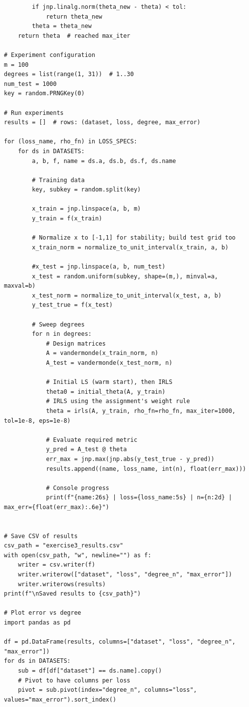 \documentclass[a4paper,12pt]{article}
\begin{document}
\begin{lstlisting}
        if jnp.linalg.norm(theta_new - theta) < tol:
            return theta_new
        theta = theta_new
    return theta  # reached max_iter

# Experiment configuration
m = 100
degrees = list(range(1, 31))  # 1..30
num_test = 1000
key = random.PRNGKey(0)

# Run experiments
results = []  # rows: (dataset, loss, degree, max_error)

for (loss_name, rho_fn) in LOSS_SPECS:
    for ds in DATASETS:
        a, b, f, name = ds.a, ds.b, ds.f, ds.name

        # Training data
        key, subkey = random.split(key)
        
        x_train = jnp.linspace(a, b, m)
        y_train = f(x_train)

        # Normalize x to [-1,1] for stability; build test grid too
        x_train_norm = normalize_to_unit_interval(x_train, a, b)
        
        #x_test = jnp.linspace(a, b, num_test)
        x_test = random.uniform(subkey, shape=(m,), minval=a, maxval=b)
        x_test_norm = normalize_to_unit_interval(x_test, a, b)
        y_test_true = f(x_test)

        # Sweep degrees
        for n in degrees:
            # Design matrices
            A = vandermonde(x_train_norm, n)
            A_test = vandermonde(x_test_norm, n)

            # Initial LS (warm start), then IRLS
            theta0 = initial_theta(A, y_train)
            # IRLS using the assignment's weight rule
            theta = irls(A, y_train, rho_fn=rho_fn, max_iter=1000, tol=1e-8, eps=1e-8)

            # Evaluate required metric
            y_pred = A_test @ theta
            err_max = jnp.max(jnp.abs(y_test_true - y_pred))
            results.append((name, loss_name, int(n), float(err_max)))

            # Console progress
            print(f"{name:26s} | loss={loss_name:5s} | n={n:2d} | max_err={float(err_max):.6e}")


# Save CSV of results
csv_path = "exercise3_results.csv"
with open(csv_path, "w", newline="") as f:
    writer = csv.writer(f)
    writer.writerow(["dataset", "loss", "degree_n", "max_error"])
    writer.writerows(results)
print(f"\nSaved results to {csv_path}")

# Plot error vs degree
import pandas as pd

df = pd.DataFrame(results, columns=["dataset", "loss", "degree_n", "max_error"])
for ds in DATASETS:
    sub = df[df["dataset"] == ds.name].copy()
    # Pivot to have columns per loss
    pivot = sub.pivot(index="degree_n", columns="loss", values="max_error").sort_index()


\end{lstlisting}
\end{document}
